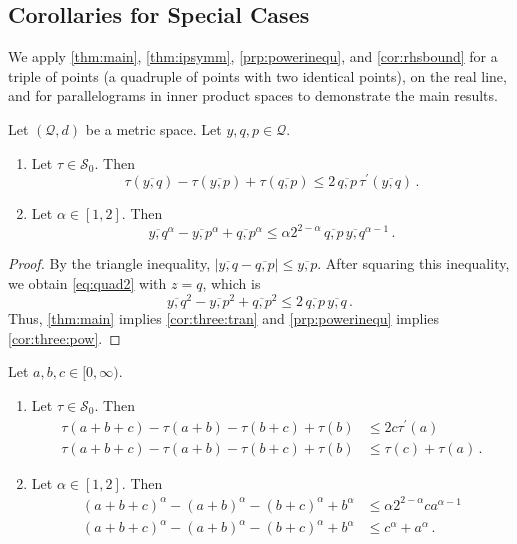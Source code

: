 \documentclass{article}
\newcommand{\abs}[1]{\left| #1 \right|} %
\newcommand*{\mc}[1]{\mathcal{#1}}
\newcommand{\Rp}{[0, \infty)} %
\newcommand{\pr}{^\prime}
\newcommand{\equationFullstop}{\, .}
\newcommand{\eqfs}{\equationFullstop}
\newcommand{\ol}[2]{\overline{#1,#2}}
\newcommand{\tran}{\tau}
\newcommand{\dtran}{\tran\pr}
\newcommand{\setcco}{\mc S_0}
\begin{document}
\subsection{Corollaries for Special Cases}
%
We apply \cref{thm:main}, \cref{thm:ipsymm}, \cref{prp:powerinequ}, and \cref{cor:rhsbound} for a triple of points (a quadruple of points with two identical points), on the real line, and for parallelograms in inner product spaces to demonstrate the main results.
%
%
\begin{corollary}
	Let $(\mc Q, d)$ be a metric space. Let $y, q, p \in \mc Q$.
	\begin{enumerate}[label=(\roman*)]
		\item Let $\tran\in\setcco$. Then
		\begin{equation}\label{cor:three:tran}
			\tran(\ol yq) - \tran(\ol yp) + \tran(\ol qp)
			\leq 2 \, \ol qp \, \dtran(\ol yq) 
			\eqfs
		\end{equation}
		\item Let $\alpha\in[1,2]$. Then
		\begin{equation}\label{cor:three:pow}
			\ol yq^\alpha - \ol yp^\alpha + \ol qp^\alpha
			\leq \alpha 2^{2-\alpha} \, \ol qp \, \ol yq^{\alpha-1}
			\eqfs
		\end{equation}
	\end{enumerate}
\end{corollary}
%
\begin{proof}
	By the triangle inequality, $\abs{\ol yq - \ol qp} \leq \ol yp$. After squaring this inequality, we obtain \eqref{eq:quad2} with $z=q$, which is
	\begin{equation}
		\ol yq^2 - \ol yp^2 + \ol qp^2 \leq 2 \,\ol qp \, \ol yq
		\eqfs
	\end{equation}
	Thus, \cref{thm:main} implies \eqref{cor:three:tran} and \cref{prp:powerinequ} implies \eqref{cor:three:pow}.
\end{proof}
%
\begin{corollary}
	Let $a,b,c\in\Rp$.
	\begin{enumerate}[label=(\roman*)]
		\item Let $\tran\in\setcco$. Then
		\begin{align}
			\label{eq:real:quad}
			\tran(a+b+c) - \tran(a+b) - \tran(b+c) + \tran(b) 
			&\leq 2 c \dtran(a) 
			\\
			\label{eq:real:symm}
			\tran(a+b+c) - \tran(a+b) - \tran(b+c) + \tran(b)  &\leq \tran(c) + \tran(a)
			\eqfs
		\end{align}
		\item Let $\alpha\in[1,2]$. Then
		\begin{align}\label{eq:real:pow}
			(a+b+c)^\alpha - (a+b)^\alpha - (b+c)^\alpha + b^\alpha
			&\leq \alpha 2^{2-\alpha} c a^{\alpha-1} 
			\\
			\label{eq:real:powsymm}
			(a+b+c)^\alpha - (a+b)^\alpha - (b+c)^\alpha + b^\alpha
			&\leq c^\alpha + a^\alpha
			\eqfs
		\end{align}
	\end{enumerate}
\end{corollary}
\end{document}
